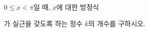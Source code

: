 $0\le x<\pi$일 때, $x$에 대한 방정식 \par\smallskip{}\par\smallskip\noindent 가 실근을 갖도록 하는 정수 $k$의 개수를 구하시오.
